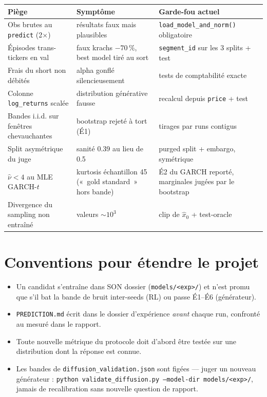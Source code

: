 \documentclass[11pt,a4paper]{article}
\newcommand{\code}[1]{\texttt{#1}}
\begin{document}
\begin{center}\small
\begin{tabular}{@{}p{5.2cm}p{5.2cm}p{4.6cm}@{}}
\toprule
\textbf{Piège} & \textbf{Symptôme} & \textbf{Garde-fou actuel} \\
\midrule
Obs brutes au \code{predict} (2$\times$) & résultats faux mais plausibles &
\code{load\_model\_and\_norm()} obligatoire \\
Épisodes trans-tickers en val & faux krachs $-70\,\%$, best model tiré au
sort & \code{segment\_id} sur les 3 splits + test \\
Frais du short non débités & alpha gonflé silencieusement & tests de
comptabilité exacte \\
Colonne \code{log\_returns} scalée & distribution générative fausse &
recalcul depuis \code{price} + test \\
Bandes i.i.d. sur fenêtres chevauchantes & bootstrap rejeté à tort (É1) &
tirages par runs contigus \\
Split asymétrique du juge & sanité 0.39 au lieu de 0.5 & purged split +
embargo, symétrique \\
$\hat\nu < 4$ au MLE GARCH-$t$ & kurtosis échantillon 45 («~gold standard~»
hors bande) & É2 du GARCH reporté, marginales jugées par le bootstrap \\
Divergence du sampling non entraîné & valeurs $\sim 10^3$ & clip de
$\hat{x}_0$ + test-oracle \\
\bottomrule
\end{tabular}
\end{center}

\section{Conventions pour étendre le projet}

\begin{itemize}[itemsep=2pt]
  \item Un candidat s'entraîne dans SON dossier (\code{models/<exp>/}) et
        n'est promu que s'il bat la bande de bruit inter-seeds (RL) ou passe
        É1--É6 (générateur).
  \item \code{PREDICTION.md} écrit dans le dossier d'expérience \emph{avant}
        chaque run, confronté au mesuré dans le rapport.
  \item Toute nouvelle métrique du protocole doit d'abord être testée sur une
        distribution dont la réponse est connue.
  \item Les bandes de \code{diffusion\_validation.json} sont figées --- juger
        un nouveau générateur : \code{python validate\_diffusion.py
        --model-dir models/<exp>/}, jamais de recalibration sans nouvelle
        question de rapport.
\end{itemize}
\end{document}

